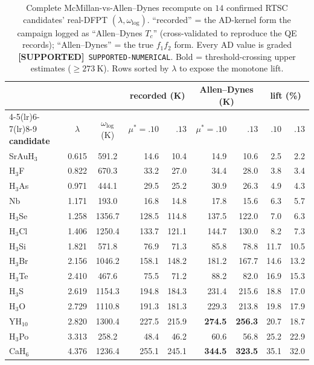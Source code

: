 \documentclass[11pt,a4paper]{article}
\providecommand{\tierGreen}{\textcolor{green!50!black}{\textbf{[SUPPORTED]}}}
\begin{document}
\begin{table}[h]
\centering
\small
\begin{tabular}{lccrrrrrr}
\toprule
& & & \multicolumn{2}{c}{\textbf{recorded (K)}}
    & \multicolumn{2}{c}{\textbf{Allen--Dynes (K)}}
    & \multicolumn{2}{c}{\textbf{lift (\%)}} \\
\cmidrule(lr){4-5}\cmidrule(lr){6-7}\cmidrule(lr){8-9}
\textbf{candidate} & $\lambda$ & $\omega_{\log}$ (K)
  & $\mu^*{=}.10$ & $.13$ & $\mu^*{=}.10$ & $.13$ & $.10$ & $.13$ \\
\midrule
SrAuH$_3$ & 0.615  & 591.2  & 14.6  & 10.4  & 14.9  & 10.6  & 2.5  & 2.2  \\
H$_3$F    & 0.822  & 670.3  & 33.2  & 27.0  & 34.4  & 28.0  & 3.8  & 3.4  \\
H$_3$As   & 0.971  & 444.1  & 29.5  & 25.2  & 30.9  & 26.3  & 4.9  & 4.3  \\
Nb        & 1.171  & 193.0  & 16.8  & 14.8  & 17.8  & 15.6  & 6.3  & 5.7  \\
H$_3$Se   & 1.258  & 1356.7 & 128.5 & 114.8 & 137.5 & 122.0 & 7.0  & 6.3  \\
H$_3$Cl   & 1.406  & 1250.4 & 133.7 & 121.1 & 144.7 & 130.0 & 8.2  & 7.3  \\
H$_3$Si   & 1.821  & 571.8  & 76.9  & 71.3  & 85.8  & 78.8  & 11.7 & 10.5 \\
H$_3$Br   & 2.156  & 1046.2 & 158.1 & 148.2 & 181.2 & 167.7 & 14.6 & 13.2 \\
H$_3$Te   & 2.410  & 467.6  & 75.5  & 71.2  & 88.2  & 82.0  & 16.9 & 15.3 \\
H$_3$S    & 2.619  & 1154.3 & 194.8 & 184.3 & 231.4 & 215.6 & 18.8 & 17.0 \\
H$_3$O    & 2.729  & 1110.8 & 191.3 & 181.3 & 229.3 & 213.8 & 19.8 & 17.9 \\
YH$_{10}$ & 2.820  & 1300.4 & 227.5 & 215.9 & \textbf{274.5} & \textbf{256.3} & 20.7 & 18.7 \\
H$_3$Po   & 3.313  & 258.2  & 48.4  & 46.2  & 60.6  & 56.8  & 25.2 & 22.9 \\
CaH$_6$   & 4.376  & 1236.4 & 255.1 & 245.1 & \textbf{344.5} & \textbf{323.5} & 35.1 & 32.0 \\
\bottomrule
\end{tabular}
\caption{Complete McMillan-vs-Allen--Dynes recompute on $14$ confirmed RTSC
candidates' real-DFPT $(\lambda,\omega_{\log})$. ``recorded'' = the AD-kernel
form the campaign logged as ``Allen--Dynes $T_c$'' (cross-validated to reproduce
the QE records); ``Allen--Dynes'' = the true $f_1 f_2$ form. Every AD value is
graded \tierGreen\ \texttt{SUPPORTED-NUMERICAL}. Bold = threshold-crossing
upper estimates ($\ge \SI{273}{\kelvin}$). Rows sorted by $\lambda$ to expose
the monotone lift.}
\label{tab:results}
\end{table}
\end{document}
